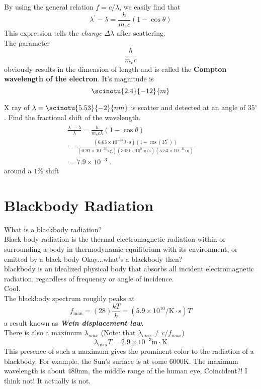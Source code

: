 By using the general relation $ f = c/\lambda $, we easily find that
\[\lambda ^ { \prime } - \lambda = \frac { h } { m _ { e } c } ( 1 - \cos \theta )  \]
This expression tells the \textit{change} $ \Delta \lambda $ after scattering. \\
The parameter 
\[ \frac { h } { m _ { e } c } \]
obviously results in the dimension of length and is called the \textbf{Compton wavelength of the electron}. It's magnitude is
\[ \scinotu{2.4}{-12}{m} \]
\begin{example}
	X ray of $ \lambda = \scinotu{5.53}{-2}{nm} $ is scatter and detected at an angle of $ 35^ \circ $. Find the fractional shift of the wavelength. \\
	\small
	\[ \begin{aligned} \frac { \lambda ^ { \prime } - \lambda } { \lambda } = \frac { h } { m _ { e } c \lambda } ( 1 - \cos \theta ) \\  = \frac { \left( 6.63 \times 10 ^ { - 34 } \mathrm { J } \cdot \mathrm { s } \right) \left( 1 - \cos \left( 35 ^ { \circ } \right) \right) } { \left( 0.91 \times 10 ^ { - 30 } \mathrm { kg } \right) \left( 3.00 \times 10 ^ { 8 } \mathrm { m } / \mathrm { s } \right) \left( 5.53 \times 10 ^ { - 11 } \mathrm { m } \right) } \\ = 7.9 \times 10 ^ { - 3 } \text { . } \end{aligned} \]
	\normalfont
	around a $ 1\% $ shift 
\end{example}
\section{Blackbody Radiation}
What is a blackbody radiation?\\
Black-body radiation is the thermal electromagnetic radiation within or surrounding a body in thermodynamic equilibrium with its environment, or emitted by a black body
Okay...what's a blackbody then?\\
blackbody is an idealized physical body that absorbs all incident electromagnetic radiation, regardless of frequency or angle of incidence. \\
Cool.\\
The blackbody spectrum roughly peaks at 
\[ f _ { \operatorname { man } } = ( 28 ) \frac { k T } { h } = \left( 5.9 \times 10 ^ { 10 } / \mathrm { K } \cdot \mathrm { s } \right) T \]
a result known as \textbf{\textit{Wein displacement law}}.\\
There is also a maximum $ \lambda_{max} $ (Note: that $ \lambda_{max} \neq c/f_{max} $)
\[ \lambda _ { \max } T = 2.9 \times 10 ^ { - 3 } \mathrm { m } \cdot \mathrm { K } \]
\indent This presence of such a maximum gives the prominent color to the radiation of a blackbody. For example, the Sun's surface is at some $ 6000 $K. The maximum wavelength is about $ 480 $nm, the middle range of the human eye, Coincident?! I think not! It actually is not. 
